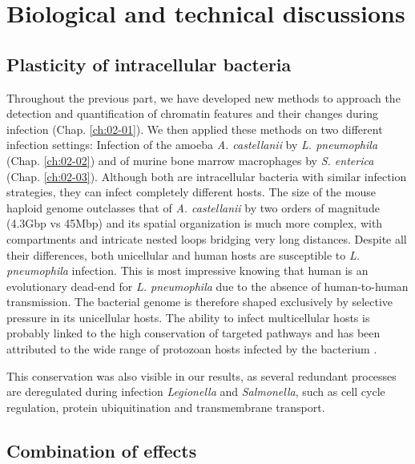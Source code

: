 
\chapter{Biological and technical discussions} %
\label{ch:03-01} %

\section{Plasticity of intracellular bacteria}

Throughout the previous part, we have developed new methods to approach the detection and quantification of chromatin features and their changes during infection (Chap. \ref{ch:02-01}). We then applied these methods on two different infection settings: Infection of the amoeba \textit{A. castellanii} by \textit{L. pneumophila} (Chap. \ref{ch:02-02}) and of murine bone marrow macrophages by \textit{S. enterica} (Chap. \ref{ch:02-03}). Although both are intracellular bacteria with similar infection strategies, they can infect completely different hosts. The size of the mouse haploid genome outclasses that of \textit{A. castellanii} by two orders of magnitude (4.3Gbp vs 45Mbp) and its spatial organization is much more complex, with compartments and intricate nested loops bridging very long distances. Despite all their differences, both unicellular and human hosts are susceptible to \textit{L. pneumophila} infection. This is most impressive knowing that human is an evolutionary dead-end for \textit{L. pneumophila} due to the absence of human-to-human transmission. The bacterial genome is therefore shaped exclusively by selective pressure in its unicellular hosts. The ability to infect multicellular hosts is probably linked to the high conservation of targeted pathways and has been attributed to the wide range of protozoan hosts infected by the bacterium \cite{molofskyDifferentiateThriveLessons2004}.

This conservation was also visible in our results, as several redundant processes are deregulated during infection \textit{Legionella} and \textit{Salmonella}, such as cell cycle regulation, protein ubiquitination and transmembrane transport.



\section{Combination of effects}

